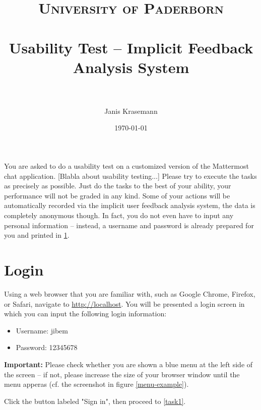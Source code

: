 \documentclass[paper=a4, fontsize=11pt]{scrartcl} %
\title{	
\normalfont \normalsize 
\textsc{University of Paderborn} \\ [25pt] %
\horrule{0.5pt} \\[0.4cm] %
\huge Usability Test -- Implicit Feedback Analysis System \\ %
\horrule{2pt} \\[0.5cm] %
}
\author{Janis Krasemann} %
\date{\normalsize\today} %
\numberwithin{equation}{section} %
\numberwithin{figure}{section} %
\numberwithin{table}{section} %
\begin{document}
\maketitle %


You are asked to do a usability test on a customized version of the Mattermost chat application.
[Blabla about usability testing...]
Please try to execute the tasks as precisely as possible.
Just do the tasks to the best of your ability, your performance will not be graded in any kind.
Some of your actions will be automatically recorded via the implicit user feedback analysis system, the data is completely anonymous though.
In fact, you do not even have to input any personal information -- instead, a username and password is already prepared for you and printed in \ref{task0}.


\section{Login}
\label{task0}

Using a web browser that you are familiar with, such as Google Chrome, Firefox, or Safari, navigate to \url{http://localhost}.
You will be presented a login screen in which you can input the following login information:

\begin{itemize}
\item Username: jibem
\item Password: 12345678
\end{itemize}

\textbf{Important:} Please check whether you are shown a blue menu at the left side of the screen -- if not, please increase the size of your browser window until the menu apperas (cf. the screenshot in figure \ref{menu-example}).

Click the button labeled "Sign in", then proceed to \ref{task1}.
\end{document}
